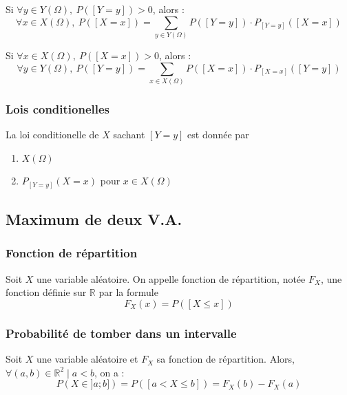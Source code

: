             Si $\forall y \in Y(\Omega),\ P([Y = y]) > 0$, alors : 
            \begin{equation*}
                \forall x \in X(\Omega),\ P([X = x]) = \sum_{y \in Y(\Omega)} P([Y = y]) \cdot P_{[Y = y]}([X = x])
            \end{equation*}

            Si $\forall x \in X(\Omega),\ P([X = x]) > 0$, alors : 
            \begin{equation*}
                \forall y \in Y(\Omega),\ P([Y = y]) = \sum_{x \in X(\Omega)} P([X = x]) \cdot P_{[X = x]}([Y = y])
            \end{equation*}

        \subsubsection{Lois conditionelles}
            La loi conditionelle de $X$ sachant $[Y = y]$ est donnée par 
            \begin{enumerate}
                \item $X(\Omega)$
                \item $P_{[Y = y]}(X = x)$ pour $x \in X(\Omega)$
            \end{enumerate}

    \subsection{Maximum de deux V.A.}

        \subsubsection{Fonction de répartition}
            Soit $X$ une variable aléatoire. On appelle fonction de répartition, notée
            $F_X$, une fonction définie sur $\mathbb{R}$ par la formule 
            \[
                F_X(x) = P([X \leq x])
            \]

        \subsubsection{Probabilité de tomber dans un intervalle}
            Soit $X$ une variable aléatoire et $F_X$ sa fonction de répartition. Alors, 
            $\forall (a,b) \in \mathbb{R}^{2} \mid a < b$, on a :
            \[
                P(X \in ]a;b]) = P([a < X \leq b]) = F_X(b) - F_X(a)
            \]
        
